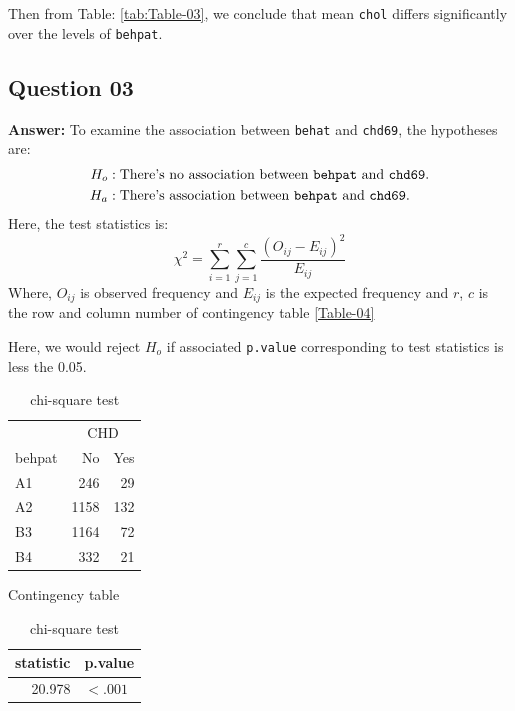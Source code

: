 \documentclass[
  12pt,
  oneside]{article}
\begin{document}
Then from Table: \ref{tab:Table-03}, we conclude that mean \texttt{chol} differs significantly over the levels of \texttt{behpat}.

\clearpage

\hypertarget{question-03}{%
\subsection{Question 03}\label{question-03}}

\textbf{Answer:} To examine the association between \texttt{behat} and \texttt{chd69}, the hypotheses are:
\begin{align*}
H_o&: \text{There's no association between \texttt{behpat} and \texttt{chd69}.} \\
H_a&: \text{There's association between \texttt{behpat} and \texttt{chd69}.}
\end{align*}
Here, the test statistics is:
\[
\chi^2 = \sum_{i=1}^{r}\sum_{j=1}^{c}\frac{(O_{ij} - E_{ij})^2}{E_{ij}}
\]
Where, \(O_{ij}\) is observed frequency and \(E_{ij}\) is the expected frequency and \(r\), \(c\) is the row and column number of contingency table \ref{Table-04}

Here, we would reject \(H_o\) if associated \texttt{p.value} corresponding to test statistics
is less the 0.05.

\begin{table}[H]
      \begin{minipage}{.5\linewidth}
      \centering
\begin{tabular}{lrr}
\toprule
\multicolumn{1}{c}{ } & \multicolumn{2}{c}{CHD} \\
\cmidrule(l{3pt}r{3pt}){2-3}
behpat & No & Yes\\
\midrule
A1 & 246 & 29\\
A2 & 1158 & 132\\
B3 & 1164 & 72\\
B4 & 332 & 21\\
\bottomrule
\end{tabular}\caption{Contingency table}
      \label{Table-04}
    \end{minipage}%
      \begin{minipage}{.5\linewidth}
        \centering
\begin{tabular}{rl}
\toprule
statistic & p.value\\
\midrule
20.978 & $<.001$\\
\bottomrule
\end{tabular}\caption{chi-square test}
    \label{Table-05}
    \end{minipage}
      \end{table}
\end{document}
